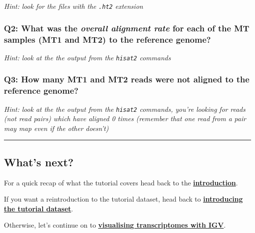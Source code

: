 \documentclass[11pt]{article}
\begin{document}
\textit{Hint: look for the files with the \texttt{.ht2} extension}

\hypertarget{q2-what-was-the-overall-alignment-rate-for-each-of-the-mt-samples-mt1-and-mt2-to-the-reference-genome}{%
\subsubsection{\texorpdfstring{Q2: What was the \textit{overall alignment
rate} for each of the MT samples (MT1 and MT2) to the reference
genome?}{Q2: What was the overall alignment rate for each of the MT samples (MT1 and MT2) to the reference genome?}}\label{q2-what-was-the-overall-alignment-rate-for-each-of-the-mt-samples-mt1-and-mt2-to-the-reference-genome}}

\textit{Hint: look at the the output from the \texttt{hisat2} commands}

\hypertarget{q3-how-many-mt1-and-mt2-reads-were-not-aligned-to-the-reference-genome}{%
\subsubsection{Q3: How many MT1 and MT2 reads were not aligned to the
reference
genome?}\label{q3-how-many-mt1-and-mt2-reads-were-not-aligned-to-the-reference-genome}}

\textit{Hint: look at the the output from the \texttt{hisat2} commands,
you're looking for reads (not read pairs) which have aligned 0 times
(remember that one read from a pair may map even if the other doesn't)}

    \begin{center}\rule{0.5\linewidth}{.4pt}\end{center}

    \hypertarget{whats-next}{%
\subsection{What's next?}\label{whats-next}}

For a quick recap of what the tutorial covers head back to the
\textbf{\href{index.ipynb}{introduction}}.

If you want a reintroduction to the tutorial dataset, head back to
\textbf{\href{dataset-intro.ipynb}{introducing the tutorial dataset}}.

Otherwise, let's continue on to
\textbf{\href{transcriptome-visualisation.ipynb}{visualising
transcriptomes with IGV}}.


\end{document}
